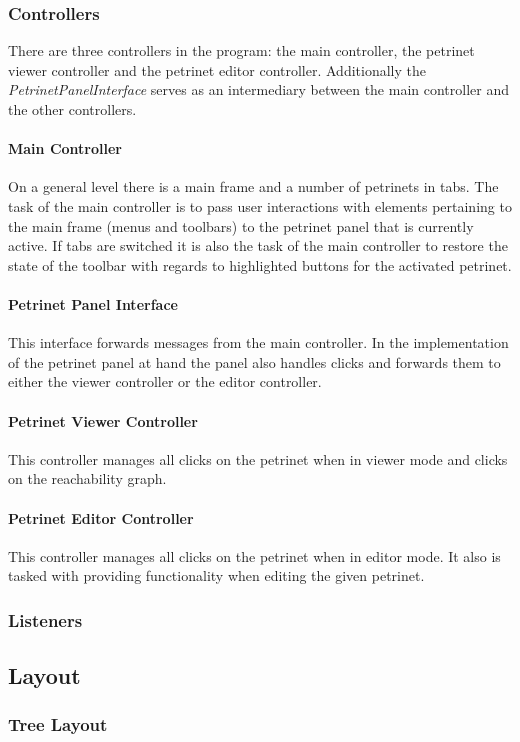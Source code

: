 \documentclass[10pt, a4paper]{article}
\begin{document}
\subsubsection{Controllers}
There are three controllers in the program: the main controller, the petrinet viewer controller and the petrinet editor controller. Additionally the \textit{PetrinetPanelInterface} serves as an intermediary between the main controller and the other controllers.

\paragraph{Main Controller} On a general level there is a main frame and a number of petrinets in tabs. The task of the main controller is to pass user interactions with elements pertaining to the main frame (menus and toolbars) to the petrinet panel that is currently active. If tabs are switched it is also the task of the main controller to restore the state of the toolbar with regards to highlighted buttons for the activated petrinet. 
\paragraph{Petrinet Panel Interface} This interface forwards messages from the main controller. In the implementation of the petrinet panel at hand the panel also handles clicks and forwards them to either the viewer controller or the editor controller. 
\paragraph{Petrinet Viewer Controller} This controller manages all clicks on the petrinet when in viewer mode and clicks on the reachability graph.  
\paragraph{Petrinet Editor Controller} This controller manages all clicks on the petrinet when in editor mode. It also is tasked with providing functionality when editing the given petrinet. 
\subsubsection{Listeners}
\subsection{Layout}
\label{label:layout}

\subsubsection{Tree Layout}
\label{label:treeLayout}
\end{document}
